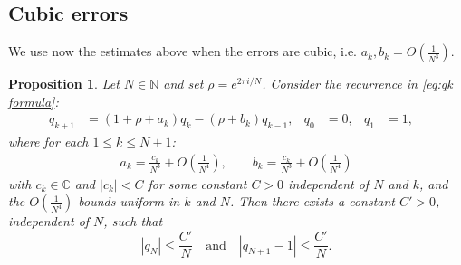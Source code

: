 \documentclass{amsart}
\newtheorem{prop}{Proposition}
\theoremstyle{remark}
\theoremstyle{definition}
\newcommand{\lp}{\left(}
\newcommand{\rp}{\right)}
\begin{document}
\subsection{Cubic errors}

We use now the estimates above when the errors are cubic, i.e. $a_{k},b_{k} = O\lp\frac{1}{N^{3}}\rp$.

\begin{prop}\label{prop:cubic}
Let $N\in\mathbb{N}$ and set $\rho = e^{2\pi i/N}$.  
Consider the recurrence in \eqref{eq:qk formula}:
	\begin{align*}
		q_{k+1} &= (1+\rho+a_k) q_{k}-(\rho+b_k) q_{k-1}, & q_0&=0, & q_1&=1, &
	\end{align*}
	where for each $1\leq k\leq N+1$: 
    \begin{align*}
        a_k =\frac{c_k}{N^3}+O\lp\frac{1}{N^4}\rp, \qquad b_k = \frac{c_k}{N^3}+O\lp\frac{1}{N^4}\rp
    \end{align*}
    with $c_k\in\mathbb{C}$ and $|c_k|<C$ for some constant $C>0$ independent of $N$ and $k$, and the $O(\tfrac{1}{N^4})$ bounds uniform in $k$ and $N$.
    Then there exists a constant $C'>0$, independent of $N$, such that
	\begin{equation*}
		|q_N| \leq \frac{C'}{N} \quad\text{and}\quad |q_{N+1}-1|\leq \frac{C'}{N}.
	\end{equation*}
\end{prop}
\end{document}
